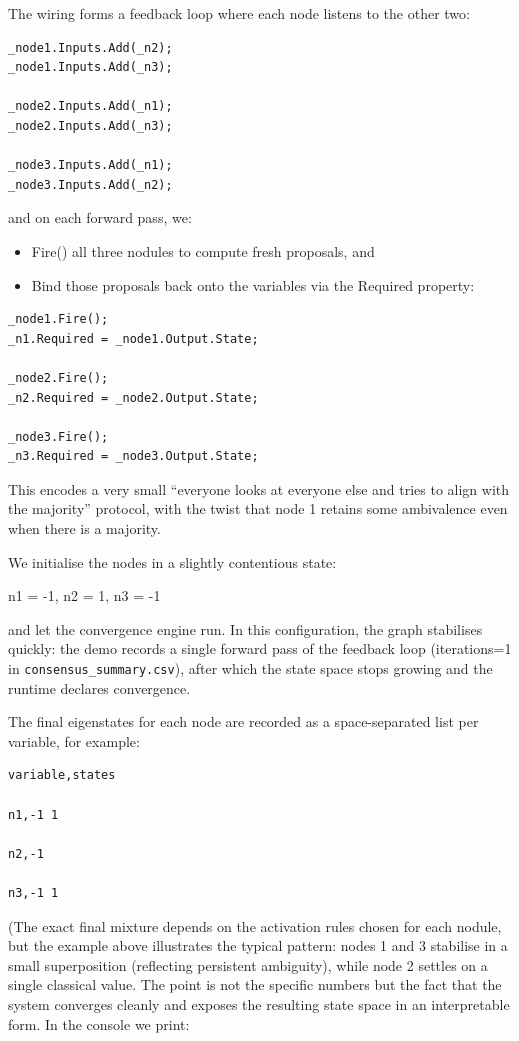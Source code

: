 \documentclass[a4paper,11pt]{article}
\begin{document}
The wiring forms a feedback loop where each node listens to the other two:

\begin{lstlisting}[style=codeblock]
_node1.Inputs.Add(_n2);
_node1.Inputs.Add(_n3);

_node2.Inputs.Add(_n1);
_node2.Inputs.Add(_n3);

_node3.Inputs.Add(_n1);
_node3.Inputs.Add(_n2);
\end{lstlisting}

and on each forward pass, we:

\begin{itemize}
\item
  Fire() all three nodules to compute fresh proposals, and
\item
  Bind those proposals back onto the variables via the Required property:
\end{itemize}

\begin{lstlisting}[style=codeblock]
_node1.Fire();
_n1.Required = _node1.Output.State;

_node2.Fire();
_n2.Required = _node2.Output.State;

_node3.Fire();
_n3.Required = _node3.Output.State;
\end{lstlisting}

This encodes a very small ``everyone looks at everyone else and tries to align with the majority'' protocol, with the twist that node 1 retains some ambivalence even when there is a majority.

We initialise the nodes in a slightly contentious state:

n1 = -1, n2 = 1, n3 = -1

and let the convergence engine run. In this configuration, the graph stabilises quickly: the demo records a single forward pass of the feedback loop (iterations=1 in \texttt{consensus\_summary.csv}), after which the state space stops growing and the runtime declares convergence.

The final eigenstates for each node are recorded as a space-separated list per variable, for example:

\begin{lstlisting}[style=datadumpnofloat]
variable,states

n1,-1 1

n2,-1

n3,-1 1
\end{lstlisting}

(The exact final mixture depends on the activation rules chosen for each nodule, but the example above illustrates the typical pattern: nodes 1 and 3 stabilise in a small superposition (reflecting persistent ambiguity), while node 2 settles on a single classical value. The point is not the specific numbers but the fact that the system converges cleanly and exposes the resulting state space in an interpretable form. In the console we print:
\end{document}
